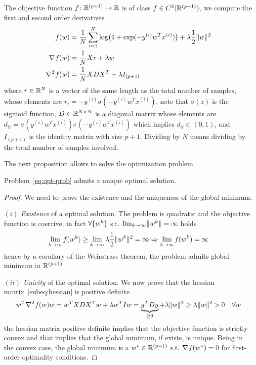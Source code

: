 The objective function $f\colon\mathbb{R}^{(p+1)}\to\mathbb{R}$ is of class $f\in C^2(\mathbb{R}^{(p+1)})$, we compute the first and second order derivatives
\begin{subequations}\label{eq:f-df-ddf}
\begin{align}
\operatorname*{\mathit{f}}(w) &= \frac{1}{N}\sum_{i=1}^N\log\bigl(1+\exp(-y^{(i)}w^Tx^{(i)})\bigr)+\lambda\frac{1}{2}\lVert w\rVert^2 \label{subeq:obj-fun} \\
\nabla\operatorname*{\mathit{f}}(w) &= \frac{1}{N}Xr+\lambda w \label{subeq:jacobian} \\
\nabla^2\operatorname*{\mathit{f}}(w) &= \frac{1}{N}XDX^T+\lambda I_{(p+1)}\label{subeq:hessian}
\end{align}
\end{subequations}
where $r\in\mathbb{R}^N$ is a vector of the same length as the total number of samples, whose elements are $r_i=-y^{(i)}\sigma(-y^{(i)}w^Tx^{(i)})$, note that $\sigma(z)$ is the sigmoid function, $D\in\mathbb{R}^{N\times N}$ is a diagonal matrix whose elements are $d_{ii}=\sigma(y^{(i)}w^Tx^{(i)})\sigma(-y^{(i)}w^Tx^{(i)})$ which implies $d_{ii}\in(0,1)$, and $I_{(p+1)}$ is the identity matrix with size $p+1$. Dividing by $N$ means dividing by the total number of samples involved.

The next proposition allows to solve the optimization problem.

\begin{prop}
Problem~\eqref{eq:opt-prob} admits a unique optimal solution.
\end{prop}
\begin{proof}
We need to prove the existence and the uniqueness of the global minimum.

\noindent$(i)$ \emph{Existence} of a optimal solution. The problem is quadratic and the objective function is coercive, in fact $\forall\{w^k\}$ s.t. $\lim_{k\to\infty}\lVert w^k\rVert=\infty$ holds
\[
\lim_{k\to\infty}\operatorname*{\mathit{f}}(w^k)\geq\lim_{k\to\infty}\lambda\frac{1}{2}\lVert w^k\rVert^2=\infty\Rightarrow\lim_{k\to\infty}\operatorname*{\mathit{f}}(w^k)=\infty
\]
hence by a corollary of the Weirstrass theorem, the problem admits global minimum in $\mathbb{R}^{(p+1)}$.

\noindent$(ii)$ \emph{Unicity} of the optimal solution. We now prove that the hessian matrix~\eqref{subeq:hessian} is positive definite
\[
w^T\nabla^2\operatorname*{\mathit{f}}(w)w=w^TXDX^Tw+\lambda w^TIw=\underbrace{y^TDy}_{\geq0}+\lambda\lVert w\rVert^2\geq\lambda\lVert w\rVert^2>0\quad\forall w
\]
the hessian matrix positive definite implies that the objective function is strictly convex and that implies that the global minimum, if exists, is unique. Being in the convex case, the global minimum is a $w^\ast\in\mathbb{R}^{(p+1)}$ s.t. $\nabla\operatorname*{\mathit{f}}(w^\ast)=0$ for first-order optimality conditions.\qedhere
\end{proof}

